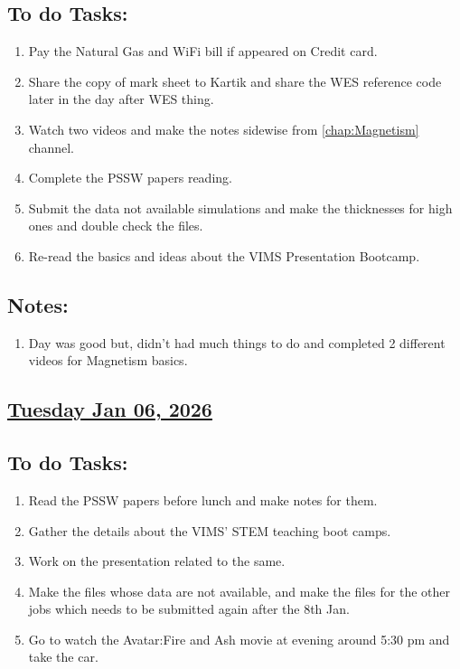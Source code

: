 \subsection*{To do Tasks:}
\begin{enumerate}
    \item Pay the Natural Gas and WiFi bill if appeared on Credit card. \cmark 
    \item Share the copy of mark sheet to Kartik and share the WES reference code later in the day after WES thing. \cmark
    \item Watch two videos and make the notes sidewise from \ref{chap:Magnetism} channel. \cmark
    \item Complete the PSSW papers reading.\xmark
    \item Submit the data not available simulations and make the thicknesses for high ones and double check the files. \xmark 
    \item Re-read the basics and ideas about the VIMS Presentation Bootcamp. \xmark
\end{enumerate}
\subsection*{Notes:}
\begin{enumerate}
    \item Day was good but, didn't had much things to do and completed 2 different videos for Magnetism basics.
\end{enumerate}
\subsection*{\underline{Tuesday Jan 06, 2026}}
\subsection*{To do Tasks:}
\begin{enumerate}
 \item Read the PSSW papers before lunch and make notes for them. \cmark
    \item Gather the details about the VIMS' STEM teaching boot camps.\cmark
    \item Work on the presentation related to the same. \xmark
    \item Make the files whose data are not available, and make the files for the other jobs which needs to be submitted again after the 8th Jan. \xmark
    \item Go to watch the Avatar:Fire and Ash movie at evening around 5:30 pm and take the car. \cmark
\end{enumerate}
